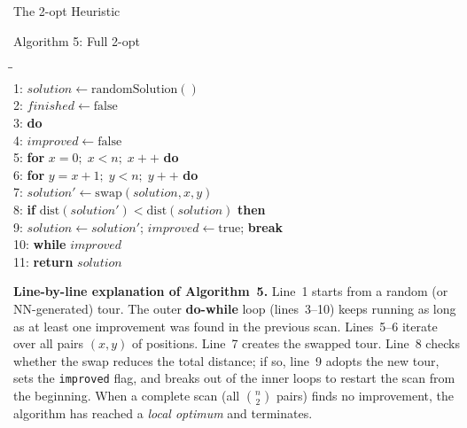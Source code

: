 \documentclass[aspectratio=169,10pt]{beamer}
\begin{document}
\begin{frame}[allowframebreaks]{The 2-opt Heuristic}
  \begin{block}{Algorithm 5: Full 2-opt}
    \begin{tabbing}
      \hspace{2em}\=\hspace{2em}\=\hspace{2em}\= \\
      1: \> $\mathit{solution} \leftarrow \mathrm{randomSolution}()$ \\
      2: \> $\mathit{finished} \leftarrow \mathrm{false}$ \\
      3: \> \textbf{do} \\
      4: \>\> $\mathit{improved} \leftarrow \mathrm{false}$ \\
      5: \>\> \textbf{for} $x = 0;\; x < n;\; x{+}{+}$ \textbf{do} \\
      6: \>\>\> \textbf{for} $y = x{+}1;\; y < n;\; y{+}{+}$ \textbf{do} \\
      7: \>\>\>\> $\mathit{solution'} \leftarrow \mathrm{swap}(\mathit{solution}, x, y)$ \\
      8: \>\>\>\> \textbf{if} $\mathrm{dist}(\mathit{solution'}) < \mathrm{dist}(\mathit{solution})$ \textbf{then} \\
      9: \>\>\>\>\> $\mathit{solution} \leftarrow \mathit{solution'}$;
                    $\mathit{improved} \leftarrow \mathrm{true}$; \textbf{break} \\
      10:\> \textbf{while} $\mathit{improved}$ \\
      11:\> \textbf{return} $\mathit{solution}$
    \end{tabbing}
  \end{block}

  \textbf{Line-by-line explanation of Algorithm~5.}
  Line~1 starts from a random (or NN-generated) tour.
  The outer \textbf{do-while} loop (lines~3--10) keeps running as long
  as at least one improvement was found in the previous scan.
  Lines~5--6 iterate over all pairs $(x,y)$ of positions.
  Line~7 creates the swapped tour.
  Line~8 checks whether the swap reduces the total distance; if so,
  line~9 adopts the new tour, sets the \texttt{improved} flag, and
  breaks out of the inner loops to restart the scan from the beginning.
  When a complete scan (all $\binom{n}{2}$ pairs) finds no improvement,
  the algorithm has reached a \emph{local optimum} and terminates.

\framebreak


\end{frame}
\end{document}
